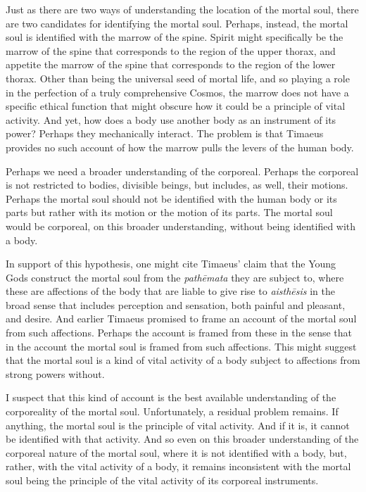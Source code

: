 Just as there are two ways of understanding the location of the mortal soul, there are two candidates for identifying the mortal soul. Perhaps, instead, the mortal soul is identified with the marrow of the spine. Spirit might specifically be the marrow of the spine that corresponds to the region of the upper thorax, and appetite the marrow of the spine that corresponds to the region of the lower thorax. Other than being the universal seed of mortal life, and so playing a role in the perfection of a truly comprehensive Cosmos, the marrow does not have a specific ethical function that might obscure how it could be a principle of vital activity. And yet, how does a body use another body as an instrument of its power? Perhaps they mechanically interact. The problem is that Timaeus provides no such account of how the marrow pulls the levers of the human body.

Perhaps we need a broader understanding of the corporeal. Perhaps the corporeal is not restricted to bodies, divisible beings, but includes, as well, their motions. Perhaps the mortal soul should not be identified with the human body or its parts but rather with its motion or the motion of its parts. The mortal soul would be corporeal, on this broader understanding, without being identified with a body.

In support of this hypothesis, one might cite Timaeus' claim that the Young Gods construct the mortal soul from the \emph{pathēmata} they are subject to, where these are affections of the body that are liable to give rise to \emph{aisthēsis} in the broad sense that includes perception and sensation, both painful and pleasant, and desire. And earlier Timaeus promised to frame an account of the mortal soul from such affections. Perhaps the account is framed from these in the sense that in the account the mortal soul is framed from such affections. This might suggest that the mortal soul is a kind of vital activity of a body subject to affections from strong powers without.

I suspect that this kind of account is the best available understanding of the corporeality of the mortal soul. Unfortunately, a residual problem remains. If anything, the mortal soul is the principle of vital activity. And if it is, it cannot be identified with that activity. And so even on this broader understanding of the corporeal nature of the mortal soul, where it is not identified with a body, but, rather, with the vital activity of a body, it remains inconsistent with the mortal soul being the principle of the vital activity of its corporeal instruments.

